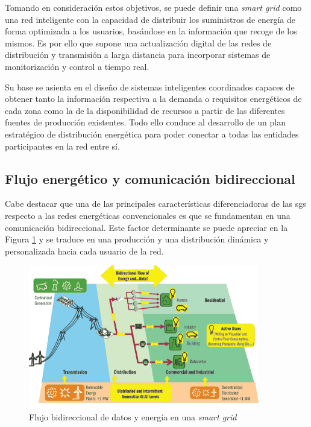 \vspace{1mm}

Tomando en consideración estos objetivos, se puede definir una \textit{smart grid} como una red inteligente con la capacidad de distribuir los suministros de energía de forma optimizada a los usuarios, basándose en la información que recoge de los mismos. Es por ello que supone una actualización digital de las redes de distribución y transmisión a larga distancia para incorporar sistemas de monitorización y control a tiempo real. \cite{iotfutura} 

\vspace{3mm}

Su base se asienta en el diseño de sistemas inteligentes coordinados capaces de obtener tanto la información respectiva a la demanda o requisitos energéticos de cada zona como la de la disponibilidad de recursos a partir de las diferentes fuentes de producción existentes. Todo ello conduce al desarrollo de un plan estratégico de distribución energética para poder conectar a todas las entidades participantes en la red entre sí. \cite{repsol}

\vspace{1mm}

\subsection{Flujo energético y comunicación bidireccional}

Cabe destacar que una de las principales características diferenciadoras de las \gls{sg}s respecto a las redes energéticas convencionales es que se fundamentan en una comunicación bidireccional. Este factor determinante se puede apreciar en la Figura \ref{fig:bidireccional} y se traduce en una producción y una distribución dinámica y personalizada hacia cada usuario de la red. 

\begin{figure}[h!]
  \centering
  \includegraphics[width=0.9\textwidth]{img/teoria/sg.png}
  \caption{Flujo bidireccional de datos y energía en una \textit{smart grid} \cite{sins}}
  \label{fig:bidireccional}
\end{figure}

